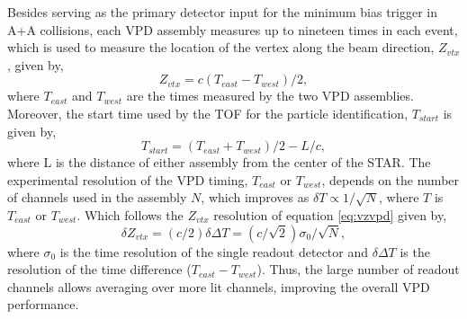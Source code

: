 Besides serving as the primary detector input for the minimum bias trigger in A+A collisions, each VPD assembly measures up to nineteen times in each event, which is used to measure the location of the vertex along the beam direction, $Z_{vtx}$, given by,
\begin{equation}
    Z_{vtx} = c(T_{east} - T_{west})/2,
    \label{eq:vzvpd}
\end{equation}
where $T_{east}$ and $T_{west}$ are the times measured by the two VPD assemblies. Moreover, the start time used by the TOF for the particle identification, $T_{start}$ is given by, 
\begin{equation}
    T_{start} = (T_{east} + T_{west})/2 - L/c,
\end{equation}
where L is the distance of either assembly from the center of the STAR. The experimental resolution of the VPD timing, $T_{east}$ or $T_{west}$, depends on the number of channels used in the assembly $N$, which improves as $\delta T \propto 1/\sqrt{N}$, where $T$ is $T_{east} $ or $T_{west}$. Which follows the $Z_{vtx}$ resolution of equation \ref{eq:vzvpd} given by, 
\begin{equation}
    \delta Z_{vtx} =(c/2)\delta \Delta T = (c/\sqrt{2})\sigma_0 /\sqrt{N},
\end{equation}
where $\sigma_0$ is the time resolution of the single readout detector and $\delta \Delta T$ is the resolution of the time difference ($T_{east} - T_{west}$). Thus, the large number of readout channels allows averaging over more lit channels, improving the overall VPD performance.  


 